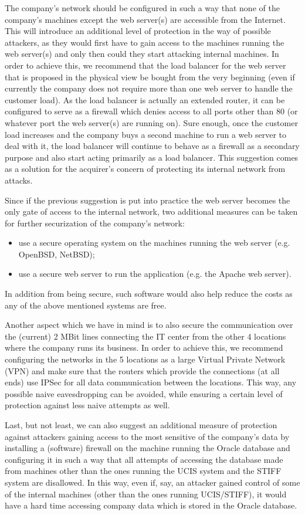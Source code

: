 The company's network should be configured in such a way that none of the company's machines except the web server(s)
are accessible from the Internet. This will introduce an additional level of protection in the way of possible attackers, as
they would first have to gain access to the machines running the web server(s) and only then could they start attacking
internal machines. In order to achieve this, we recommend that the load balancer for the web server that is proposed in the
physical view be bought from the very beginning (even if currently the company does not require more than one web
server to handle the customer load). As the load balancer is actually an extended router, it can be configured to serve as
a firewall which denies access to all ports other than 80 (or whatever port the web server(s) are running on). Sure enough,
once the customer load increases and the company buys a second machine to run a web server to deal with it, the load
balancer will continue to behave as a firewall as a secondary purpose and also start acting primarily as a load balancer.
This suggestion comes as a solution for the acquirer's concern of protecting its internal network from attacks.

Since if the previous suggestion is put into practice the web server becomes the only gate of access to the internal network,
two additional measures can be taken for further securization of the company's network:

\begin{itemize}
\item use a secure operating system on the machines running the web server (e.g. OpenBSD, NetBSD);
\item use a secure web server to run the application (e.g. the Apache web server).
\end{itemize}

In addition from being secure, such software would also help reduce the costs as any of the above mentioned systems
are free.

Another aspect which we have in mind is to also secure the communication over the (current) 2 MBit lines connecting
the IT center from the other 4 locations where the company runs its business. In order to achieve this, we recommend
configuring the networks in the 5 locations as a large Virtual Private Network (VPN) and make sure that the routers
which provide the connections (at all ends) use IPSec for all data communication between the locations. This way, any
possible naive eavesdropping can be avoided, while ensuring a certain level of protection against less naive attempts
as well.

Last, but not least, we can also suggest an additional measure of protection against attackers gaining access to the most
sensitive of the company's data by installing a (software) firewall on the machine running the Oracle database and
configuring it in such a way that all attempts of accessing the database made from machines other than the ones running
the UCIS system and the STIFF system are disallowed. In this way, even if, say, an attacker gained control of some of
the internal machines (other than the ones running UCIS/STIFF), it would have a hard time accessing company data
which is stored in the Oracle database.